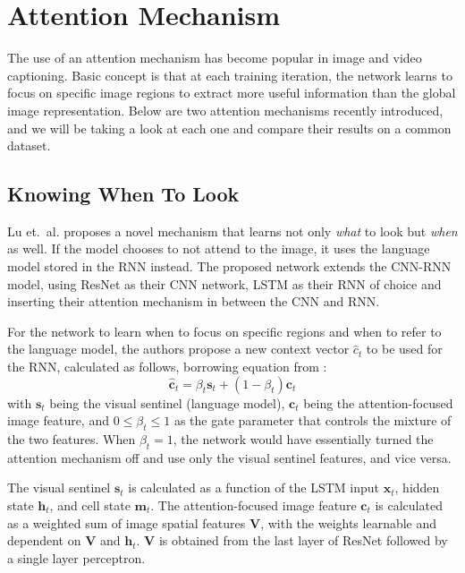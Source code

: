 \documentclass[12pt,onecolumn,letterpaper,draftclsnofoot]{article}
\begin{document}
\section{Attention Mechanism}

The use of an attention mechanism has become popular in image and video
captioning. Basic concept is that at each training iteration, the network
learns to focus on specific image regions to extract more useful information
than the global image representation. Below are two attention mechanisms
recently introduced, and we will be taking a look at each one and compare
their results on a common dataset.

\subsection{Knowing When To Look}
Lu et.\ al.\cite{attentionwhen} proposes a novel mechanism that learns not only
\textit{what} to look but \textit{when} as well. If the model chooses to not
attend to the image, it uses the language model stored in the RNN instead.
The proposed network extends the CNN-RNN model, using ResNet \cite{resnet} as
their CNN network, LSTM as their RNN of choice and inserting their attention
mechanism in between the CNN and RNN.

For the network to learn when to focus on specific regions and when to refer
to the language model, the authors propose a new context vector $\hat{c}_t$ to
be used for the RNN, calculated as follows, borrowing equation from
\cite{attentionwhen}:
%
\begin{equation}
  \hat{\bm{c}}_t = \beta_t \bm{s}_t + (1 - \beta_t) \bm{c}_t
\end{equation}
%
with $\bm{s}_t$ being the visual sentinel (language model), $\bm{c}_t$ being
the attention-focused image feature, and $0 \le \beta_t \le 1$ as the gate
parameter that controls the mixture of the two features. When $\beta_t=1$, the
network would have essentially turned the attention mechanism off and use only
the visual sentinel features, and vice versa.

The visual sentinel $\bm{s}_t$ is calculated as a function of the LSTM input
$\bm{x}_t$, hidden state $\bm{h}_t$, and cell state $\bm{m}_t$. The
attention-focused image feature $\bm{c}_t$ is calculated as a weighted sum of
image spatial features $\bm{V}$, with the weights learnable and dependent on
$\bm{V}$ and $\bm{h}_t$. $\bm{V}$ is obtained from the last layer of ResNet
\cite{resnet} followed by a single layer perceptron.
\end{document}

